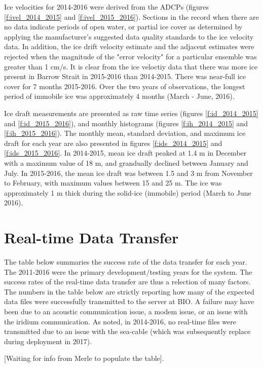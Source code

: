 \documentclass[12pt]{dforeport}
\begin{document}
Ice velocities for 2014-2016 were derived from the ADCPs (figures \ref{f:ivel_2014_2015}  and \ref{f:ivel_2015_2016}).   Sections in the record when there are no data indicate periods of open water, or partial ice cover as determined by applying the manufacturer's suggested data quality standards to the ice velocity data.  In addition, the ice drift velocity estimate and the adjacent estimates were rejected when the magnitude of the "error velocity" for a particular ensemble was greater than 1 cm/s.  It is clear from the ice veloctiy data that there was more ice present in Barrow Strait in 2015-2016 than 2014-2015. There was near-full ice cover for 7 months 2015-2016.  Over the two years of observations, the longest period of immobile ice was approximately 4 months (March - June, 2016).

Ice draft measurements are presented as raw time series (figures \ref{f:id_2014_2015} and \ref{f:id_2015_2016}), and monthly histograms (figures \ref{f:ih_2014_2015} and \ref{f:ih_2015_2016}). The monthly mean, standard deviation, and maximum ice draft for each year are also presented in figures \ref{f:ids_2014_2015} and \ref{f:ids_2015_2016}. 
In 2014-2015, mean ice draft peaked at 1.4 m in December with a maximum value of 18 m, and grandually declined between January and July.  In 2015-2016, the mean ice draft was between 1.5 and 3 m from November to February, with maximum values between 15 and 25 m.  The ice was approximately 1 m thick during the solid-ice (immobile) period (March to June 2016).

\section{Real-time Data Transfer}

The table below summaries the success rate of the data transfer for each year. The 2011-2016 were the primary development/testing years for the system. The success rates of the real-time data transfer are thus a relection of many factors. The numbers in the table below are strictly reporting how many of the expected data files were successfully transmitted to the server at BIO. A failure may have been due to an acoustic communication issue, a modem issue, or an issue with the iridium communication. As noted, in 2014-2016, no real-time files were transmitted due to an issue with the sea-cable (which was subsequently replace during deployment in 2017).

[Waiting for info from Merle to populate the table].
\end{document}
